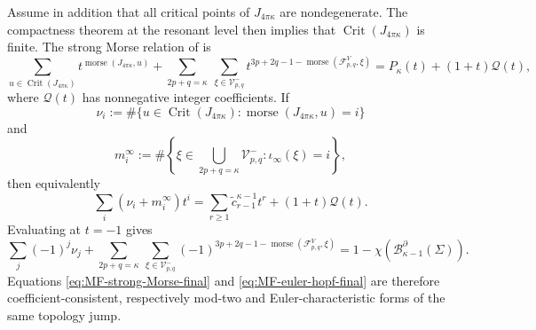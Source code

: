 \documentclass[11pt,a4paper]{article}
\numberwithin{equation}{section}
\theoremstyle{definition}
\theoremstyle{remark}
\newcommand{\Si}{\Sigma}
\newcommand{\pa}{\partial}
\newcommand{\BB}{\mathcal B}
\begin{document}
Assume in addition that all critical points of \(J_{4\pi\kappa}\) are
nondegenerate. The compactness theorem at the resonant level then implies
that \(\operatorname{Crit}(J_{4\pi\kappa})\) is finite. The strong Morse relation of
\cite[Theorem~1.3]{AHW2026} is
\begin{equation}\label{eq:MF-strong-Morse-final}
\sum_{u\in\operatorname{Crit}(J_{4\pi\kappa})}
t^{\operatorname{morse}(J_{4\pi\kappa},u)}
+
\sum_{2p+q=\kappa}\ \sum_{\xi\in\mathcal V_{p,q}^-}
t^{3p+2q-1-\operatorname{morse}(\mathcal F_{p,q}^V,\xi)}
=P_\kappa(t)+(1+t)\mathcal Q(t),
\end{equation}
where \(\mathcal Q(t)\) has nonnegative integer coefficients. If
\[
\nu_i:=\#\{u\in\operatorname{Crit}(J_{4\pi\kappa}):
\operatorname{morse}(J_{4\pi\kappa},u)=i\}
\]
and
\[
m_i^\infty:=
\#\left\{\xi\in\bigcup_{2p+q=\kappa}\mathcal V_{p,q}^-:
\iota_\infty(\xi)=i\right\},
\]
then equivalently
\begin{equation}\label{eq:MF-coefficient-Morse-relation}
\sum_i(\nu_i+m_i^\infty)t^i
=\sum_{r\ge1}\widetilde c_{r-1}^{\kappa-1}t^r
+(1+t)\mathcal Q(t).
\end{equation}
Evaluating at \(t=-1\) gives
\begin{equation}\label{eq:MF-euler-hopf-final}
\sum_j(-1)^j\nu_j+
\sum_{2p+q=\kappa}\ \sum_{\xi\in\mathcal V_{p,q}^-}
(-1)^{3p+2q-1-\operatorname{morse}(\mathcal F_{p,q}^V,\xi)}
=1-\chi(\BB_{\kappa-1}^{\pa}(\Si)).
\end{equation}
Equations \eqref{eq:MF-strong-Morse-final} and
\eqref{eq:MF-euler-hopf-final} are therefore coefficient-consistent,
respectively mod-two and Euler-characteristic forms of the same topology
jump.
\end{document}
